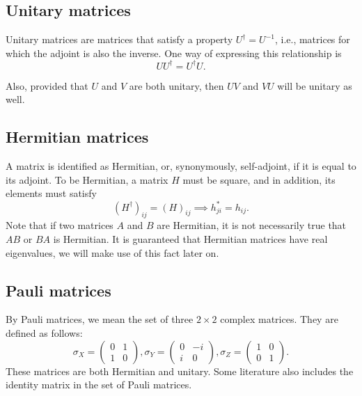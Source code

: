 \subsection{Unitary matrices}
Unitary matrices are matrices that satisfy a property $U^\dag = U^{-1}$, i.e., matrices for which the adjoint is also the inverse. One way of expressing this relationship is 
$$U U^{\dag} = U^{\dag} U.$$

Also, provided that $U$ and $V$ are both unitary, then $UV$ and $VU$ will be unitary as well.

\subsection{Hermitian matrices}
A matrix is identified as Hermitian, or, synonymously, self-adjoint, if it is equal to its adjoint. To be Hermitian, a matrix $H$ must be square, and in addition, its elements must satisfy $$(H^{\dag})_{ij} = (H)_{ij} \implies h^{*}_{ji} = h_{ij}.$$ Note that if two matrices $A$ and $B$ are Hermitian, it is not necessarily true that $AB$ or $BA$ is Hermitian. It is guaranteed that Hermitian matrices have real eigenvalues, we will make use of this fact later on.

\subsection{Pauli matrices}\label{sec:pauli-matrices}
By Pauli matrices, we mean the set of three $2 \times 2$ complex matrices. They are defined as follows:
$$\sigma_X = \begin{pmatrix}
    0 & 1 \\
    1 & 0
\end{pmatrix}, \sigma_Y = \begin{pmatrix}
    0 & -i \\
    i & 0
\end{pmatrix}, \sigma_Z = \begin{pmatrix}
    1 & 0 \\
    0 & 1
\end{pmatrix}\text{.}$$ 
These matrices are both Hermitian and unitary. Some literature also includes the identity matrix in the set of Pauli matrices. 

